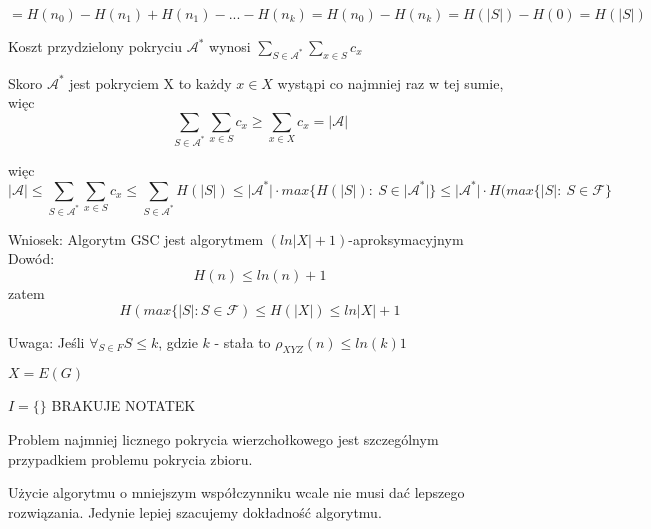 $$ = H(n_0) - H(n_1) + H(n_1) - ... - H(n_k) = H(n_0) - H(n_k) = H(\vert S\vert ) - H(0) = H(\vert S\vert )$$

Koszt przydzielony pokryciu $\mathcal{A}^{\ast}$ wynosi $\sum_{S\in \mathcal{A}^{\ast}}\sum_{x\in S}c_x$

Skoro $\mathcal{A}^{\ast}$ jest pokryciem X to każdy $x \in X$ wystąpi co najmniej raz w tej sumie, więc
$$\sum_{S\in \mathcal{A}^{\ast}}\sum_{x\in S}c_x \geq \sum_{x\in X}c_x = \vert \mathcal{A}\vert$$

więc $$\vert \mathcal{A}\vert \leq \sum_{S\in \mathcal{A}^{\ast}}\sum_{x\in S}c_x \leq \sum_{S\in \mathcal{A}^{\ast}}H(\vert S\vert )\leq \vert \mathcal{A}^{\ast}\vert \cdot max\lbrace H(\vert S\vert):\ S\in \vert \mathcal{A}^{\ast}\vert\rbrace \leq\vert\mathcal{A}^{\ast}\vert \cdot H(max\lbrace\vert S\vert :\ S\in \mathcal{F}\rbrace$$

Wniosek: Algorytm GSC jest algorytmem $(ln\vert X \vert + 1)$-aproksymacyjnym\\
Dowód: 
$$H(n)\leq ln(n)+1$$
zatem
$$H(max\lbrace\vert S\vert :S\in \mathcal{F})\leq H(\vert X\vert )\leq ln\vert X\vert + 1$$

Uwaga: Jeśli $\forall_{S \in F} S \leq k$, gdzie $k$ - stała to $\rho_{XYZ}(n) \leq ln(k) 1$

$X = E(G)$

$I=\{ \}$   BRAKUJE NOTATEK

Problem najmniej licznego pokrycia wierzchołkowego jest szczególnym przypadkiem problemu pokrycia zbioru.

Użycie algorytmu o mniejszym współczynniku wcale nie musi dać lepszego rozwiązania. Jedynie lepiej szacujemy dokładność algorytmu.